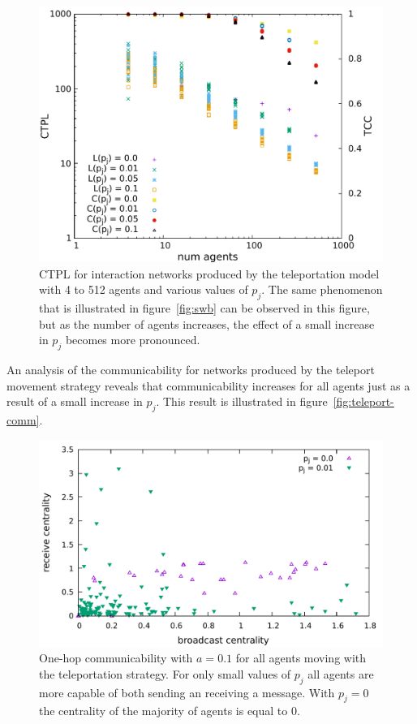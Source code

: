 \documentclass[conference]{IEEEtran}
\begin{document}
\begin{figure}
  \includegraphics[width=\columnwidth]{teleport-scaling.pdf}
  \caption{CTPL for interaction networks produced by the teleportation
    model with 4 to 512 agents and various values of $p_j$. The same
    phenomenon that is illustrated in figure~\ref{fig:swb} can be
    observed in this figure, but as the number of agents increases,
    the effect of a small increase in $p_j$ becomes more pronounced.}
  \label{fig:teleport-scale}
\end{figure}

An analysis of the communicability for networks produced by the
teleport movement strategy reveals that communicability increases for
all agents just as a result of a small increase in $p_j$. This result
is illustrated in figure~\ref{fig:teleport-comm}.
\begin{figure}
  \includegraphics[width=\columnwidth]{teleport_centrality-oh.pdf}
  \caption{One-hop communicability with $a = 0.1$ for all agents
    moving with the teleportation strategy. For only small values of
    $p_j$ all agents are more capable of both sending an receiving a
    message. With $p_j = 0$ the centrality of the majority of agents
    is equal to 0.}
  \label{fig:teleport:comm}
\end{figure}
\end{document}
